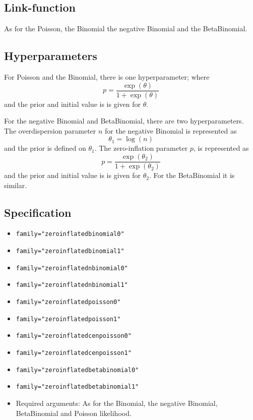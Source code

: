 \documentclass[a4paper,11pt]{article}
\begin{document}
\subsection*{Link-function}

As for the Poisson, the Binomial the negative Binomial and the BetaBinomial.

\subsection*{Hyperparameters}

For Poisson and the Binomial, there is one hyperparameter; where
\begin{displaymath}
    p = \frac{\exp(\theta)}{1+\exp(\theta)}
\end{displaymath}
and the prior and initial value is is given for $\theta$.

For the negative Binomial and BetaBinomial, there are two
hyperparameters.  The overdispersion parameter $n$ for the negative
Binomial is represented as
\begin{displaymath}
    \theta_{1} = \log(n)
\end{displaymath}
and the prior is defined on $\theta_{1}$. The zero-inflation parameter
$p$, is represented as
\begin{displaymath}
    p = \frac{\exp(\theta_{2})}{1+\exp(\theta_{2})}
\end{displaymath}
and the prior and initial value is is given for $\theta_{2}$. For the
BetaBinomial it is similar.

\subsection*{Specification}

\begin{itemize}
\item \texttt{family="zeroinflatedbinomial0"}
\item \texttt{family="zeroinflatedbinomial1"}
\item \texttt{family="zeroinflatednbinomial0"}
\item \texttt{family="zeroinflatednbinomial1"}
\item \texttt{family="zeroinflatedpoisson0"}
\item \texttt{family="zeroinflatedpoisson1"}
\item \texttt{family="zeroinflatedcenpoisson0"}
\item \texttt{family="zeroinflatedcenpoisson1"}
\item \texttt{family="zeroinflatedbetabinomial0"}
\item \texttt{family="zeroinflatedbetabinomial1"}
\item Required arguments: As for the Binomial, the negative Binomial,
    BetaBinomial and Poisson likelihood.
\end{itemize}
\end{document}
